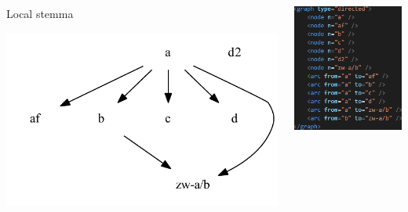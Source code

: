 \documentclass[10pt]{beamer}
\begin{document}
	\begin{frame}
		\begin{columns}
			\begin{column}{0.55\textwidth}
				\begin{center}
					Local stemma
				\end{center}
				\includegraphics[width=\textwidth]{../img/B25K1V4U22-26-local-stemma-no-legend.pdf}
			\end{column}
			\begin{column}{0.4\textwidth}
				\includegraphics[scale=0.6667]{../img/local-stemma-xml.png}
			\end{column}
		\end{columns}
	\end{frame}
\end{document}
